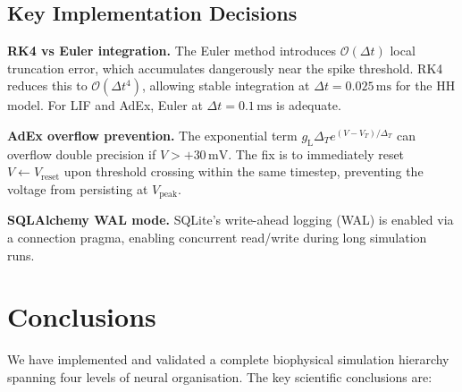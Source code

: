 \documentclass[11pt, a4paper, twocolumn]{article}
\newcommand{\Vreset}{\ensuremath{V_{\mathrm{reset}}}}
\newcommand{\gL}{\ensuremath{g_{\mathrm{L}}}}
\newcommand{\dT}{\ensuremath{\Delta_{T}}}
\newcommand{\mV}{\ensuremath{\,\mathrm{mV}}}
\newcommand{\ms}{\ensuremath{\,\mathrm{ms}}}
\begin{document}
\subsection{Key Implementation Decisions}

\begin{notebox}[title=Engineering Notes]
\textbf{RK4 vs Euler integration.} The Euler method introduces $\mathcal{O}(\Delta t)$
local truncation error, which accumulates dangerously near the spike threshold.
RK4 reduces this to $\mathcal{O}(\Delta t^4)$, allowing stable integration
at $\Delta t = 0.025\ms$ for the HH model. For LIF and AdEx, Euler at
$\Delta t = 0.1\ms$ is adequate.

\textbf{AdEx overflow prevention.} The exponential term
$\gL\dT e^{(V-V_T)/\dT}$ can overflow double precision if $V > +30\mV$.
The fix is to immediately reset $V \leftarrow \Vreset$ upon threshold crossing
within the same timestep, preventing the voltage from persisting at $V_{\mathrm{peak}}$.

\textbf{SQLAlchemy WAL mode.} SQLite's write-ahead logging (WAL) is
enabled via a connection pragma, enabling concurrent read/write during
long simulation runs.
\end{notebox}

\section{Conclusions}
\label{sec:conclusions}

We have implemented and validated a complete biophysical simulation
hierarchy spanning four levels of neural organisation. The key scientific
conclusions are:
\end{document}
